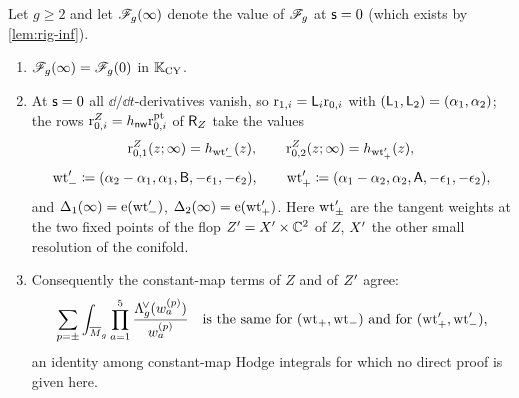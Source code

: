\begin{prop}[the flop identity $\sF_g(\infty)=\sF_g(0)$]
\label{prop:rig-flop}
Let $g\geq 2$ and let $\mathscr{F}_g(\infty)$ denote the value of $\mathscr{F}_g$ at $\mathsf{s}=0$ (which exists by \cref{lem:rig-inf}).
\begin{enumerate}
\item $\sF_g(\infty)=\sF_g(0)$ in $\mathbb{K}_{\mathrm{CY}}$.
\item At $\mathsf{s}=0$ all $\dd/\dd t$-derivatives vanish, so $\mathrm{r}_{1,i}=\mathsf{L}_i\mathrm{r}_{0,i}$ with $(\mathsf{L}_1,\mathsf{L}_2)=(\alpha_1,\alpha_2)$; the rows $\mathrm{r}^{Z}_{0,i}=h_{\mathsf{nw}}\mathrm{r}^{\mathrm{pt}}_{0,i}$ of $\mathsf{R}_{Z}$ take the values
\[
\mathrm{r}^{Z}_{0,1}(z;\infty)=h_{\mathrm{wt}'_-}(z),\qquad \mathrm{r}^{Z}_{0,2}(z;\infty)=h_{\mathrm{wt}'_+}(z),
\]
\[
\mathrm{wt}'_-\coloneqq(\alpha_2-\alpha_1,\alpha_1,\mathsf{B},-\epsilon_1,-\epsilon_2),\qquad
\mathrm{wt}'_+\coloneqq(\alpha_1-\alpha_2,\alpha_2,\mathsf{A},-\epsilon_1,-\epsilon_2),
\]
and $\Delta_1(\infty)=\mathrm{e}(\mathrm{wt}'_-)$, $\Delta_2(\infty)=\mathrm{e}(\mathrm{wt}'_+)$. Here $\mathrm{wt}'_\pm$ are the tangent weights at the two fixed points of the flop $Z'=X'\times\mathbb{C}^2$ of $Z$, $X'$ the other small resolution of the conifold.
\item Consequently the constant-map terms of $Z$ and of $Z'$ agree:
\[
\sum_{p=\pm}\int_{\overline{M}_g}\prod_{a=1}^{5}\frac{\Lambda^{\!\vee}_g(w^{(p)}_a)}{w^{(p)}_a}\quad\text{is the same for }(\mathrm{wt}_+,\mathrm{wt}_-)\text{ and for }(\mathrm{wt}'_+,\mathrm{wt}'_-),
\]
an identity among constant-map Hodge integrals for which no direct proof is given here.
\end{enumerate}
\end{prop}

